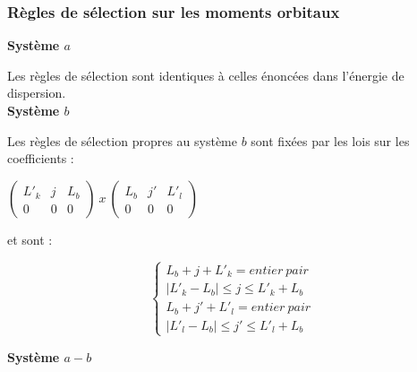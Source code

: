 \subsubsection{Règles de sélection sur les moments orbitaux}

\textbf{Système $a$}

Les règles de sélection sont identiques à celles énoncées dans l'énergie de dispersion. \\

\textbf{Système $b$}

Les règles de sélection propres au système $b$ sont fixées par les lois sur les coefficients : 

\begin{center}
	$\begin{pmatrix}
	L'_{k} & j & L_{b}\\
	0 & 0 & 0 
	\end{pmatrix} \ x \ \begin{pmatrix}
	L_{b} & j' & L'_{l}\\
	0 & 0 & 0
	\end{pmatrix}$
\end{center}

et sont : 

\begin{equation}
\begin{cases}
L_{b} + j + L'_{k} = entier\ pair \\
|L'_{k} - L_{b}| \leq j \leq L'_{k} + L_{b} \\
L_{b} + j' + L'_{l} = entier\ pair \\
|L'_{l} - L_{b}| \leq j' \leq L'_{l} + L_{b}
\end{cases}
\end{equation}

\textbf{Système $a - b$}
